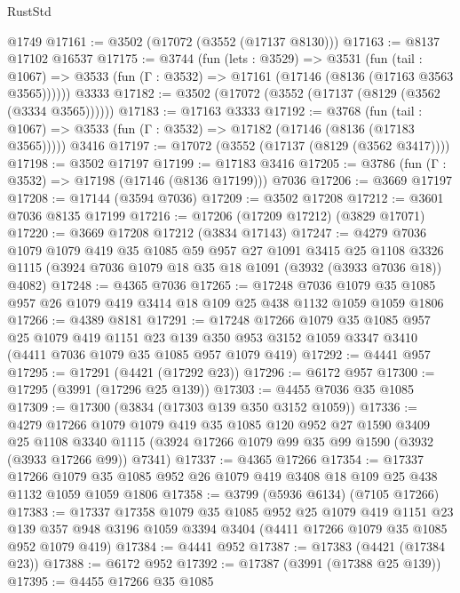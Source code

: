 \begin{lexlean}{RustStd}
\begin{coremodule}
    @1749
@17161 := @3502 (@17072 (@3552 (@17137 @8130)))
@17163 := @8137 @17102 @16537
@17175 := @3744
    (fun (lets : @3529) =>
    @3531
      (fun (tail : @1067) =>
      @3533 (fun (Γ : @3532) => @17161 (@17146 (@8136 (@17163 @3563 @3565))))))
    @3333
@17182 := @3502 (@17072 (@3552 (@17137 (@8129 (@3562 (@3334 @3565))))))
@17183 := @17163 @3333
@17192 := @3768
    (fun (tail : @1067) => @3533 (fun (Γ : @3532) => @17182 (@17146 (@8136 (@17183 @3565)))))
    @3416
@17197 := @17072 (@3552 (@17137 (@8129 (@3562 @3417))))
@17198 := @3502 @17197
@17199 := @17183 @3416
@17205 := @3786 (fun (Γ : @3532) => @17198 (@17146 (@8136 @17199))) @7036
@17206 := @3669 @17197
@17208 := @17144 (@3594 @7036)
@17209 := @3502 @17208
@17212 := @3601 @7036 @8135 @17199
@17216 := @17206 (@17209 @17212) (@3829 @17071)
@17220 := @3669 @17208 @17212 (@3834 @17143)
@17247 := @4279
    @7036
    @1079
    @1079
    @419
    @35
    @1085
    @59
    @957
    @27
    @1091
    @3415
    @25
    @1108
    @3326
    @1115
    (@3924 @7036 @1079 @18 @35 @18 @1091 (@3932 (@3933 @7036 @18)) @4082)
@17248 := @4365 @7036
@17265 := @17248
    @7036
    @1079
    @35
    @1085
    @957
    @26
    @1079
    @419
    @3414
    @18
    @109
    @25
    @438
    @1132
    @1059
    @1059
    @1806
@17266 := @4389 @8181
@17291 := @17248
    @17266
    @1079
    @35
    @1085
    @957
    @25
    @1079
    @419
    @1151
    @23
    @139
    @350
    @953
    @3152
    @1059
    @3347
    @3410
    (@4411 @7036 @1079 @35 @1085 @957 @1079 @419)
@17292 := @4441 @957
@17295 := @17291 (@4421 (@17292 @23))
@17296 := @6172 @957
@17300 := @17295 (@3991 (@17296 @25 @139))
@17303 := @4455 @7036 @35 @1085
@17309 := @17300 (@3834 (@17303 @139 @350 @3152 @1059))
@17336 := @4279
    @17266
    @1079
    @1079
    @419
    @35
    @1085
    @120
    @952
    @27
    @1590
    @3409
    @25
    @1108
    @3340
    @1115
    (@3924 @17266 @1079 @99 @35 @99 @1590 (@3932 (@3933 @17266 @99)) @7341)
@17337 := @4365 @17266
@17354 := @17337
    @17266
    @1079
    @35
    @1085
    @952
    @26
    @1079
    @419
    @3408
    @18
    @109
    @25
    @438
    @1132
    @1059
    @1059
    @1806
@17358 := @3799 (@5936 @6134) (@7105 @17266)
@17383 := @17337
    @17358
    @1079
    @35
    @1085
    @952
    @25
    @1079
    @419
    @1151
    @23
    @139
    @357
    @948
    @3196
    @1059
    @3394
    @3404
    (@4411 @17266 @1079 @35 @1085 @952 @1079 @419)
@17384 := @4441 @952
@17387 := @17383 (@4421 (@17384 @23))
@17388 := @6172 @952
@17392 := @17387 (@3991 (@17388 @25 @139))
@17395 := @4455 @17266 @35 @1085

\end{coremodule}
\end{lexlean}
